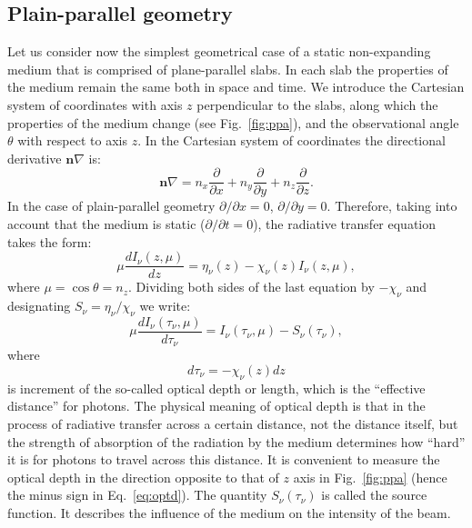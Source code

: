 \documentclass[paper=a4, fontsize=11pt]{article}
\numberwithin{equation}{section}
\numberwithin{figure}{section}
\numberwithin{table}{section}
\newcommand{\mb}[1]{\mathbf{#1}}
\begin{document}
\subsection{Plain-parallel geometry}\label{sect:ppg}
Let us consider now the simplest geometrical case of a static non-expanding medium that is comprised of plane-parallel slabs.
In each slab the properties of the medium remain the same both in space and time.
We introduce the Cartesian system of coordinates with axis $z$ perpendicular to the slabs, 
along which the properties of the medium change (see Fig.~\ref{fig:ppa}), and the observational angle $\theta$ with respect to axis $z$.
In the Cartesian system of coordinates the directional derivative $\mb{n}\nabla$ is:
\begin{equation}
\mb{n}\nabla = n_x\frac{\partial}{\partial x} + n_y\frac{\partial}{\partial y} + n_z\frac{\partial}{\partial z}.
\end{equation}
In the case of plain-parallel geometry $\partial / \partial x = 0$, $ \partial / \partial y = 0$.
Therefore, taking into account that the medium is static ($\partial / \partial t = 0$),
the radiative transfer equation takes the form:
\begin{equation}\label{eq:rte_pp}
\mu\frac{dI_\nu(z, \mu)}{dz} = \eta_\nu(z) - \chi_\nu(z)I_\nu(z, \mu),
\end{equation}
where $\mu = \cos\theta = n_z$.
Dividing both sides of the last equation by $-\chi_\nu$ and designating $S_\nu = \eta_\nu / \chi_\nu$ we write:
\begin{equation}\label{eq:rte_mus}
\mu\frac{dI_\nu(\tau_\nu, \mu)}{d\tau_\nu} = I_\nu(\tau_\nu, \mu) - S_\nu(\tau_\nu),
\end{equation}
where
\begin{equation}\label{eq:optd}
d\tau_\nu = -\chi_\nu(z)dz
\end{equation}
is increment of the so-called optical depth or length, which is the ``effective distance'' for photons.
The physical meaning of optical depth is that in the process of radiative transfer across a certain distance, 
not the distance itself, but the strength of absorption of the radiation by the medium 
determines how ``hard'' it is for photons to travel across this distance.
It is convenient to measure the optical depth in the direction opposite to that of $z$ axis in Fig.~\ref{fig:ppa}
(hence the minus sign in Eq.~\ref{eq:optd}).
The quantity $S_\nu(\tau_\nu)$ is called the source function.
It describes the influence of the medium on the intensity of the beam.
\end{document}

